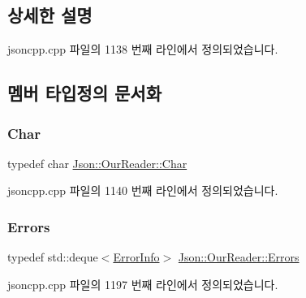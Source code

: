 \subsection{상세한 설명}


jsoncpp.\+cpp 파일의 1138 번째 라인에서 정의되었습니다.



\subsection{멤버 타입정의 문서화}
\mbox{\label{class_json_1_1_our_reader_a0cd0bab4caa66594ab843ccd5f9dc239}} 
\subsubsection{\texorpdfstring{Char}{Char}}
{\footnotesize\ttfamily typedef char \hyperlink{class_json_1_1_our_reader_a0cd0bab4caa66594ab843ccd5f9dc239}{Json\+::\+Our\+Reader\+::\+Char}}



jsoncpp.\+cpp 파일의 1140 번째 라인에서 정의되었습니다.

\mbox{\label{class_json_1_1_our_reader_a8cc69593ef7303e58e99bb5dbb767562}} 
\subsubsection{\texorpdfstring{Errors}{Errors}}
{\footnotesize\ttfamily typedef std\+::deque$<$\hyperlink{class_json_1_1_our_reader_1_1_error_info}{Error\+Info}$>$ \hyperlink{class_json_1_1_our_reader_a8cc69593ef7303e58e99bb5dbb767562}{Json\+::\+Our\+Reader\+::\+Errors}\hspace{0.3cm}{\ttfamily [private]}}



jsoncpp.\+cpp 파일의 1197 번째 라인에서 정의되었습니다.

\mbox{\label{class_json_1_1_our_reader_a1bdc7bbc52ba87cae6b19746f2ee0189}} 
